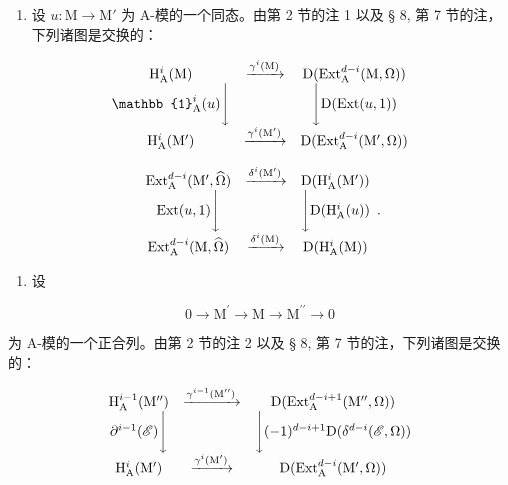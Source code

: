 \begin{enumerate}
\def\labelenumi{\arabic{enumi})}
\setcounter{enumi}{1}
\tightlist
\item
  设 \(u: \mathrm{M} \to \mathrm{M}'\) 为 A-模的一个同态。由第 2 节的注 1 以及 § 8, 第 7 节的注，下列诸图是交换的：
\end{enumerate}

\[
\begin{array}{c c c} \mathrm{H} _ {\mathrm{A}} ^ {i} (\mathrm{M}) & \xrightarrow {\gamma^ {i} (\mathrm{M})} & \mathrm{D} (\mathrm{Ext} _ {\mathrm{A}} ^ {d - i} (\mathrm{M}, \Omega)) \\ \mathbb {1} _ {\mathrm{A}} ^ {i} (u) \Bigg \downarrow & & \Bigg \downarrow \mathrm{D} (\mathrm{Ext} (u, 1)) \\ \mathrm{H} _ {\mathrm{A}} ^ {i} (\mathrm{M} ^ {\prime}) & \xrightarrow {\gamma^ {i} (\mathrm{M} ^ {\prime})} & \mathrm{D} (\mathrm{Ext} _ {\mathrm{A}} ^ {d - i} (\mathrm{M} ^ {\prime}, \Omega)) \end{array}
\]

\[
\begin{array}{c c c} \operatorname{Ext} _ {\mathrm{A}} ^ {d - i} (\mathrm{M} ^ {\prime}, \widehat {\Omega}) & \xrightarrow {\delta^ {i} (\mathrm{M} ^ {\prime})} & \mathrm{D} (\mathrm{H} _ {\mathrm{A}} ^ {i} (\mathrm{M} ^ {\prime})) \\ \operatorname{Ext} (u, 1) \Bigg \downarrow & & \Bigg \downarrow \mathrm{D} (\mathrm{H} _ {\mathrm{A}} ^ {i} (u)) \\ \operatorname{Ext} _ {\mathrm{A}} ^ {d - i} (\mathrm{M}, \widehat {\Omega}) & \xrightarrow {\delta^ {i} (\mathrm{M})} & \mathrm{D} (\mathrm{H} _ {\mathrm{A}} ^ {i} (\mathrm{M})) \end{array} .
\]

\begin{enumerate}
\def\labelenumi{\arabic{enumi})}
\setcounter{enumi}{2}
\tightlist
\item
  设
\end{enumerate}

\[
0 \rightarrow \mathrm{M} ^ {\prime} \rightarrow \mathrm{M} \rightarrow \mathrm{M} ^ {\prime \prime} \rightarrow 0\tag{ℰ}
\]

为 A-模的一个正合列。由第 2 节的注 2 以及 § 8, 第 7 节的注，下列诸图是交换的：

\[
\begin{array}{c c c} \mathrm{H} _ {\mathrm{A}} ^ {i - 1} (\mathrm{M} ^ {\prime \prime}) & \xrightarrow {\gamma^ {i - 1} (\mathrm{M} ^ {\prime \prime})} & \mathrm{D} (\mathrm{Ext} _ {\mathrm{A}} ^ {d - i + 1} (\mathrm{M} ^ {\prime \prime}, \Omega)) \\ \partial^ {i - 1} (\mathscr {E}) \Bigg \downarrow & & \Bigg \downarrow (- 1) ^ {d - i + 1} \mathrm{D} (\delta^ {d - i} (\mathscr {E}, \Omega)) \\ \mathrm{H} _ {\mathrm{A}} ^ {i} (\mathrm{M} ^ {\prime}) & \xrightarrow {\gamma^ {i} (\mathrm{M} ^ {\prime})} & \mathrm{D} (\mathrm{Ext} _ {\mathrm{A}} ^ {d - i} (\mathrm{M} ^ {\prime}, \Omega)) \end{array}
\]

